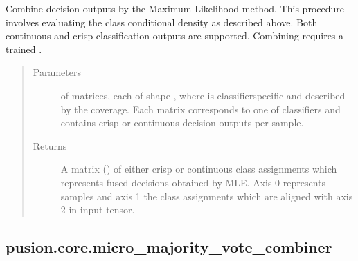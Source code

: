 \documentclass[letterpaper,10pt,english]{sphinxmanual}
\begin{document}
\begin{fulllineitems}
\begin{fulllineitems}
\label{\detokenize{pusion.core.maximum_likelihood_combiner:pusion.core.maximum_likelihood_combiner.CRMaximumLikelihoodCombiner.combine}}
\sphinxAtStartPar
Combine decision outputs by the Maximum Likelihood method. This procedure involves evaluating the class
conditional density as described above. Both continuous and crisp classification outputs are supported.
Combining requires a trained {\hyperref[\detokenize{pusion.core.maximum_likelihood_combiner:pusion.core.maximum_likelihood_combiner.MaximumLikelihoodCombiner}]{}}.
\begin{quote}\begin{description}
\item[{Parameters}] \leavevmode
\sphinxAtStartPar
{} \textendash{}  of  matrices, each of shape ,
where  is classifier\sphinxhyphen{}specific and described by the coverage. Each matrix corresponds to
one of  classifiers and contains crisp or continuous decision outputs per sample.

\item[{Returns}] \leavevmode
\sphinxAtStartPar
A matrix () of either crisp or continuous class assignments which represents fused
decisions obtained by MLE. Axis 0 represents samples and axis 1 the class assignments which are aligned
with axis 2 in  input tensor.

\end{description}\end{quote}

\end{fulllineitems}


\end{fulllineitems}



\subsection{pusion.core.micro\_majority\_vote\_combiner}
\label{\detokenize{pusion.core.micro_majority_vote_combiner:module-pusion.core.micro_majority_vote_combiner}}\label{\detokenize{pusion.core.micro_majority_vote_combiner:pusion-core-micro-majority-vote-combiner}}\label{\detokenize{pusion.core.micro_majority_vote_combiner:mimv-cref}}\label{\detokenize{pusion.core.micro_majority_vote_combiner::doc}}
\end{document}
